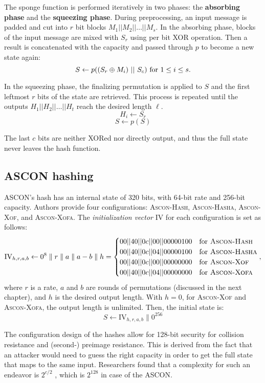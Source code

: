 The sponge function is performed iteratively in two phases: the \textbf{absorbing phase} and the \textbf{squeezing phase}. During preprocessing, an input message is padded and cut into $r$ bit blocks $M_1||M_2||\ldots||M_s$. In the absorbing phase, blocks of the input message are mixed with $S_r$ using per bit XOR operation. Then a result is concatenated with the capacity and passed through $p$ to become a new state again:
\begin{equation}
    S \leftarrow p((S_r \oplus M_i)~||~S_c)~\text{for}~1 \leq i \leq s. \notag
\end{equation}


In the squeezing phase, the finalizing permutation is applied to $S$ and the first leftmost $r$ bits of the state are retrieved. This process is repeated until the outputs $H_1||H_2||\ldots||H_t$ reach the desired length $\ell$.
\[
    H_i \leftarrow S_r
\]
\[
    S \leftarrow p(S)
\]

The last $c$ bits are neither XORed nor directly output, and thus the full state never leaves the hash function.

\subsection{ASCON hashing}
ASCON's hash has an internal state of 320 bits, with 64-bit rate and 256-bit capacity. Authors provide four configurations: \textsc{Ascon-Hash, Ascon-Hasha, Ascon-Xof}, and \textsc{Ascon-Xofa}. The \textit{initialization vector} IV for each configuration is set as follows:
\[
\text{IV}_{h,r,a,b} \leftarrow 0^8 \parallel r \parallel a \parallel a - b \parallel h =
\begin{cases}
    00||40||0c||00||00000100 & \text{for }\textsc{Ascon-Hash} \\
    00||40||0c||04||00000100 & \text{for }\textsc{Ascon-Hasha} \\
    00||40||0c||00||00000000 & \text{for }\textsc{Ascon-Xof} \\
    00||40||0c||04||00000000 & \text{for }\textsc{Ascon-Xofa} \\
\end{cases},
\]
where $r$ is a rate, $a$ and $b$ are rounds of permutations (discussed in the next chapter), and $h$ is the desired output length. With $h=0$, for \textsc{Ascon-Xof} and \textsc{Ascon-Xofa}, the output length is unlimited. Then, the initial state is:
\[
S \leftarrow \text{IV}_{h,r,a,b} \parallel 0^{256}
\]

The configuration design of the hashes allow for 128-bit security for collision resistance and (second-) preimage resistance. This is derived from the fact that an attacker would need to guess the right capacity in order to get the full state that maps to the same input. Researchers found that a complexity for such an endeavor is $2^{c/2}$ \cite{bertoniIndifferentiabilitySpongeConstruction2008}, which is $2^{128}$ in case of the ASCON.